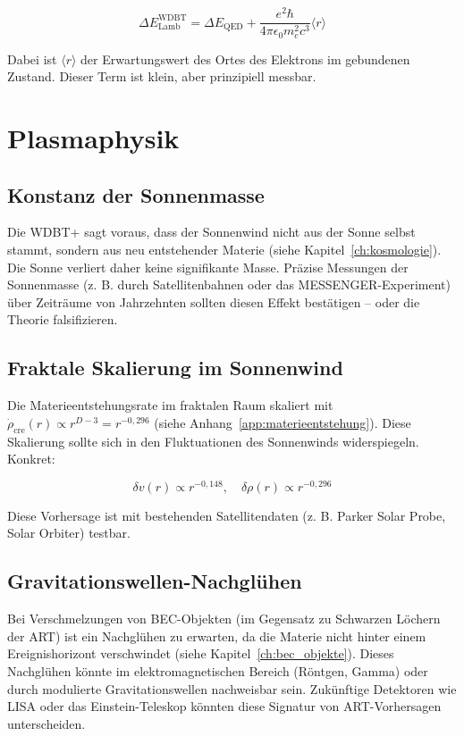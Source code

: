 \[
\Delta E_{\text{Lamb}}^{\text{WDBT}} = \Delta E_{\text{QED}} + \frac{e^2 \hbar}{4 \pi \epsilon_0 m_e^2 c^3} \langle r \rangle
\]

Dabei ist \( \langle r \rangle \) der Erwartungswert des Ortes des Elektrons im gebundenen Zustand. Dieser Term ist klein, aber prinzipiell messbar.

\section{Plasmaphysik}
\label{sec:vorh_plasma}

\subsection{Konstanz der Sonnenmasse}
\label{sub:vorh_sonnenmasse}

Die WDBT+ sagt voraus, dass der Sonnenwind nicht aus der Sonne 
selbst stammt, sondern aus neu entstehender Materie (siehe Kapitel~\ref{ch:kosmologie}). 
Die Sonne verliert daher keine signifikante Masse. 
Präzise Messungen der Sonnenmasse (z. B. durch 
Satellitenbahnen oder das MESSENGER-Experiment) über 
Zeiträume von Jahrzehnten sollten diesen Effekt bestätigen 
– oder die Theorie falsifizieren.

\subsection{Fraktale Skalierung im Sonnenwind}
\label{sub:vorh_sonnenwind}

Die Materieentstehungsrate im fraktalen Raum skaliert mit 
\( \dot{\rho}_{\text{cre}}(r) \propto r^{D-3} = r^{-0,296} \) (siehe Anhang~\ref{app:materieentstehung}). 
Diese Skalierung sollte sich in den Fluktuationen des 
Sonnenwinds widerspiegeln. Konkret:

\[
\delta v(r) \propto r^{-0,148}, \quad 
\delta \rho(r) \propto r^{-0,296}
\]

Diese Vorhersage ist mit bestehenden Satellitendaten 
(z. B. Parker Solar Probe, Solar Orbiter) testbar.

\subsection{Gravitationswellen-Nachglühen}
\label{sub:vorh_nachgluehen}

Bei Verschmelzungen von BEC-Objekten (im Gegensatz zu 
Schwarzen Löchern der ART) ist ein Nachglühen zu erwarten, 
da die Materie nicht hinter einem Ereignishorizont verschwindet 
(siehe Kapitel~\ref{ch:bec_objekte}). 
Dieses Nachglühen könnte im elektromagnetischen Bereich 
(Röntgen, Gamma) oder durch modulierte Gravitationswellen 
nachweisbar sein. Zukünftige Detektoren wie LISA oder das 
Einstein-Teleskop könnten diese Signatur von ART-Vorhersagen 
unterscheiden.

